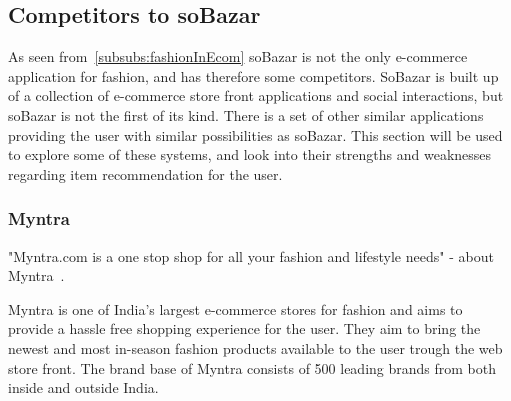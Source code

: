 \subsection{Competitors to soBazar}
    As seen from~\ref{subsubs:fashionInEcom} soBazar is not the only e-commerce application for fashion, and has therefore some competitors.
    SoBazar is built up of a collection of e-commerce store front applications and social interactions, but soBazar is not the first of its kind.
    There is a set of other similar applications providing the user with similar possibilities as soBazar.
    This section will be used to explore some of these systems, and look into their strengths and weaknesses regarding item recommendation for the user.

\subsubsection{Myntra} %
\label{par:myntra}
    "Myntra.com is a one stop shop for all your fashion and lifestyle needs" - about Myntra~\cite{myntra}.

    Myntra is one of India's largest e-commerce stores for fashion and aims to  provide a hassle free shopping experience for the user.
    They aim to bring the newest and most in-season fashion products available to the user trough the web store front.
    The brand base of Myntra consists of 500 leading brands from both inside and outside India.

